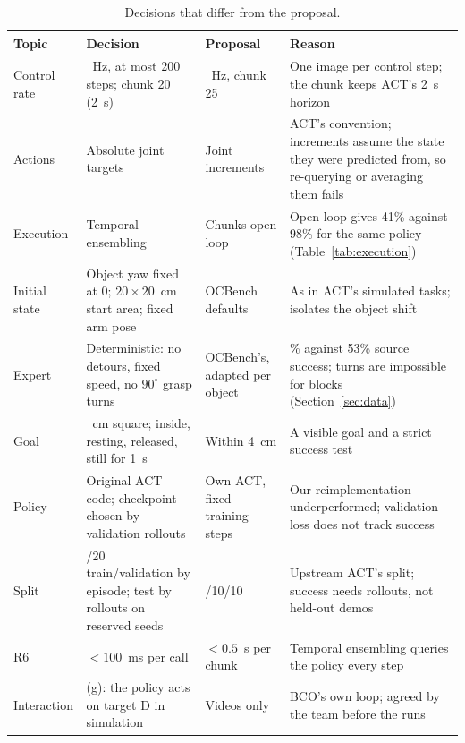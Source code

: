 \documentclass{article}
\begin{document}
\begin{table}[t]
  \caption{Decisions that differ from the proposal.}
  \label{tab:deviations}
  \centering
  \small
  \begin{tabular}{@{}>{\raggedright\arraybackslash}p{1.6cm}>{\raggedright\arraybackslash}p{3.0cm}>{\raggedright\arraybackslash}p{2.6cm}>{\raggedright\arraybackslash}p{5.4cm}@{}}
    \toprule
    Topic & Decision & Proposal & Reason \\
    \midrule
    Control rate & 10~Hz, at most 200 steps; chunk 20 (2~s) & 50~Hz, chunk 25 &
      One image per control step; the chunk keeps ACT's 2~s horizon \\
    Actions & Absolute joint targets & Joint increments &
      ACT's convention; increments assume the state they were predicted from, so
      re-querying or averaging them fails \\
    Execution & Temporal ensembling & Chunks open loop &
      Open loop gives 41\% against 98\% for the same policy
      (Table~\ref{tab:execution}) \\
    Initial state & Object yaw fixed at 0; $20 \times 20$~cm start area; fixed arm pose &
      OCBench defaults & As in ACT's simulated tasks; isolates the object shift \\
    Expert & Deterministic: no detours, fixed speed, no $90^\circ$ grasp turns &
      OCBench's, adapted per object &
      99\% against 53\% source success; turns are impossible for blocks
      (Section~\ref{sec:data}) \\
    Goal & 12~cm square; inside, resting, released, still for 1~s & Within 4~cm &
      A visible goal and a strict success test \\
    Policy & Original ACT code; checkpoint chosen by validation rollouts &
      Own ACT, fixed training steps &
      Our reimplementation underperformed; validation loss does not track success \\
    Split & 80/20 train/validation by episode; test by rollouts on reserved seeds &
      80/10/10 & Upstream ACT's split; success needs rollouts, not held-out demos \\
    R6 & $< 100$~ms per call & $< 0.5$~s per chunk &
      Temporal ensembling queries the policy every step \\
    Interaction & (g): the policy acts on target D in simulation & Videos only &
      BCO's own loop; agreed by the team before the runs \\
    \bottomrule
  \end{tabular}
\end{table}
\end{document}
